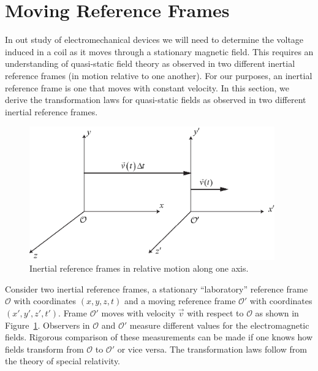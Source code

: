 \documentclass[11pt,a4paper,oneside]{book}
\numberwithin{equation}{section}
\theoremstyle{it}
\theoremstyle{definition}
\begin{document}
\section{Moving Reference Frames}\label{moving_reference_section}
In out study of electromechanical devices we will need to determine the voltage 
induced in a coil as it moves through a stationary magnetic field. This 
requires an understanding of quasi-static field theory as observed in two 
different inertial reference frames (in motion relative to one another). For 
our purposes, an inertial reference frame is one that moves with constant 
velocity. In this section, we derive the transformation laws for quasi-static 
fields as observed in two different inertial reference frames.
\begin{figure}[H]
	\centering
	\includegraphics[width = 300pt, angle = 0, 
	keepaspectratio]{figures/appendix/traslating_reference_frame.eps}
	\captionsetup{width=0.75\textwidth}		
	\caption{Inertial reference frames in relative motion along one axis.}
	\label{inertial_ref_frame}
\end{figure}
Consider two inertial reference frames, a stationary “laboratory” reference 
frame $\mathcal{O}$ with coordinates $(x,y,z,t)$ and a moving reference frame 
$\mathcal{O'}$ with coordinates $(x',y',z',t')$. Frame $\mathcal{O'}$ moves 
with velocity $\vec{v}$ with respect to  $\mathcal{O}$ as shown in 
Figure~\ref{inertial_ref_frame}. Observers in $\mathcal{O}$ and $\mathcal{O'}$ 
measure different values for the electromagnetic fields. Rigorous comparison of 
these measurements can be made if one knows how fields transform from 
$\mathcal{O}$ to $\mathcal{O'}$ or vice versa. The transformation laws follow 
from the theory of special relativity. 
\end{document}
